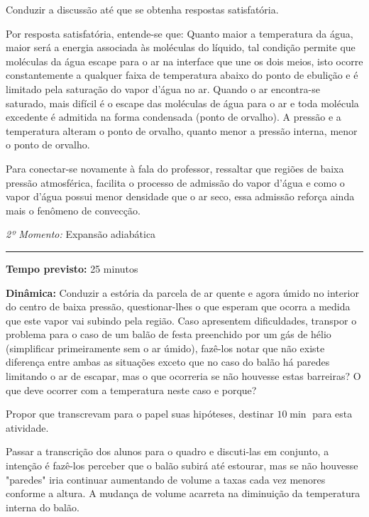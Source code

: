 \documentclass[
12pt,				%
openright,			%
oneside,			%
a4paper,			%
chapter=TITLE,		%
english,			%
brazil				%
]{abntex2}
\begin{document}
Conduzir a discussão até que se obtenha respostas satisfatória.

Por resposta satisfatória, entende-se que: Quanto maior a temperatura da água, maior será a energia associada às moléculas do líquido, tal condição permite que moléculas da água escape para o ar na interface que une os dois meios, isto ocorre constantemente a qualquer faixa de temperatura abaixo do ponto de ebulição e é limitado pela saturação do vapor d'água no ar. Quando o ar encontra-se saturado, mais difícil é o escape das moléculas de água para o ar e toda molécula excedente é admitida na forma condensada (ponto de orvalho). A pressão e a temperatura alteram o ponto de orvalho, quanto menor a pressão interna, menor o ponto de orvalho.

Para conectar-se novamente à fala do professor, ressaltar que regiões de baixa pressão atmosférica, facilita o processo de admissão do vapor d'água e como o vapor d'água possui menor densidade que o ar seco, essa admissão reforça ainda mais o fenômeno de convecção.

\vspace{50pt}
\noindent\emph{2º Momento:} Expansão adiabática
\par\noindent\rule{.3\textwidth}{.5pt}    
\par\noindent\textbf{Tempo previsto:} 25 minutos


\noindent\textbf{Dinâmica:} Conduzir a estória da parcela de ar quente e agora úmido no interior do centro de baixa pressão, questionar-lhes o que esperam que ocorra a medida que este vapor vai subindo pela região. Caso apresentem dificuldades, transpor o problema para o caso de um balão de festa preenchido por um gás de hélio (simplificar primeiramente sem o ar úmido), fazê-los notar que não existe diferença entre ambas as situações exceto que no caso do balão há paredes limitando o ar de escapar, mas o que ocorreria se não houvesse estas barreiras? O que deve ocorrer com a temperatura neste caso e porque?

Propor que transcrevam para o papel suas hipóteses, destinar $10\min$ para esta atividade.

Passar a transcrição dos alunos para o quadro e discuti-las em conjunto, a intenção é fazê-los perceber que o balão subirá até estourar, mas se não houvesse "paredes" iria continuar aumentando de volume a taxas cada vez menores conforme a altura. A mudança de volume acarreta na diminuição da temperatura interna do balão. 
\end{document}
